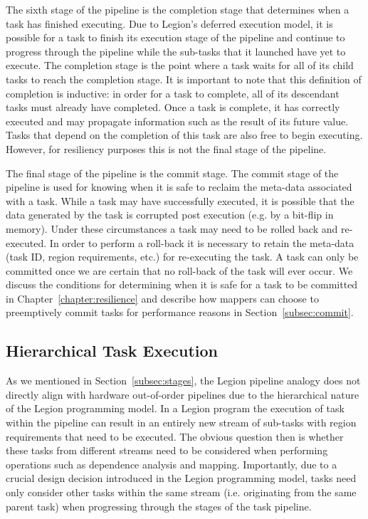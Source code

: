 The sixth stage of the pipeline is the completion
stage that determines when a task has finished
executing.  Due to Legion's deferred execution model,
it is possible for a task to finish its execution
stage of the pipeline and continue to progress through
the pipeline while the sub-tasks that it launched
have yet to execute. The completion stage is the
point where a task waits for all of its child tasks
to reach the completion stage. It is important to
note that this definition of completion is inductive: 
in order for a task to complete, all of its descendant 
tasks must already have completed. Once a task is 
complete, it has correctly executed and may propagate 
information such as the result of its future value.  
Tasks that depend on the completion of this task 
are also free to begin executing.  However, for 
resiliency purposes this is not the final stage 
of the pipeline.

The final stage of the pipeline is the commit stage.
The commit stage of the pipeline is used for knowing
when it is safe to reclaim the meta-data associated 
with a task. While a task may have successfully
executed, it is possible that the data generated
by the task is corrupted post execution (e.g. by
a bit-flip in memory). Under these circumstances a task may 
need to be rolled back and re-executed. In order to
perform a roll-back it is necessary to retain the
meta-data (task ID, region requirements, etc.)
for re-executing the task. A task can only be 
committed once we are certain that no roll-back
of the task will ever occur.  We discuss the
conditions for determining when it is safe for a 
task to be committed in Chapter~\ref{chapter:resilience}
and describe how mappers can choose to 
preemptively commit tasks for performance reasons
in Section~\ref{subsec:commit}.

\subsection{Hierarchical Task Execution}
\label{subsec:hierarchical}
As we mentioned in Section~\ref{subsec:stages}, the
Legion pipeline analogy does not directly align with
hardware out-of-order pipelines due to the hierarchical
nature of the Legion programming model.  In a Legion
program the execution of task within the pipeline can
result in an entirely new stream of sub-tasks with
region requirements that need to be executed. The
obvious question then is whether these tasks from 
different streams need to be considered when performing
operations such as dependence analysis and mapping.
Importantly, due to a crucial design decision introduced 
in the Legion programming model, tasks need only consider 
other tasks within the same stream (i.e. originating 
from the same parent task) when progressing through 
the stages of the task pipeline.

